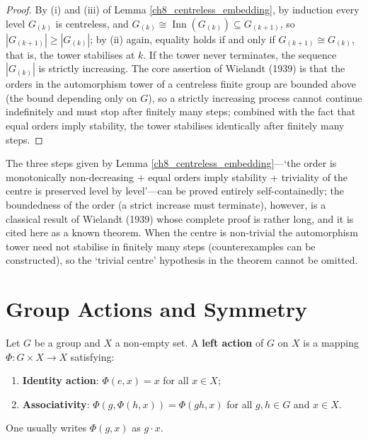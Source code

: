 \begin{proof}
By (i) and (iii) of Lemma \ref{ch8_centreless_embedding}, by induction every level $G_{(k)}$ is centreless, and $G_{(k)}\cong\operatorname{Inn}(G_{(k)})\subseteq G_{(k+1)}$, so $|G_{(k+1)}|\ge|G_{(k)}|$; by (ii) again, equality holds if and only if $G_{(k+1)}\cong G_{(k)}$, that is, the tower stabilises at $k$. If the tower never terminates, the sequence $|G_{(k)}|$ is strictly increasing. The core assertion of Wielandt (1939) is that the orders in the automorphism tower of a centreless finite group are bounded above (the bound depending only on $G$), so a strictly increasing process cannot continue indefinitely and must stop after finitely many steps; combined with the fact that equal orders imply stability, the tower stabilises identically after finitely many steps.
\end{proof}

\begin{remark}\label{rem:wielandt_boundary}
The three steps given by Lemma \ref{ch8_centreless_embedding}---`the order is monotonically non-decreasing + equal orders imply stability + triviality of the centre is preserved level by level'---can be proved entirely self-containedly; the boundedness of the order (a strict increase must terminate), however, is a classical result of Wielandt (1939) whose complete proof is rather long, and it is cited here as a known theorem. When the centre is non-trivial the automorphism tower need not stabilise in finitely many steps (counterexamples can be constructed), so the `trivial centre' hypothesis in the theorem cannot be omitted.
\end{remark}

\section{\texorpdfstring{Group Actions and Symmetry}{Group Actions and Symmetry}}

\begin{definition}\label{def:group_action_gf}
Let $G$ be a group and $X$ a non-empty set. A \textbf{left action} of $G$ on $X$ is a mapping $\Phi: G \times X \to X$ satisfying:
\begin{enumerate}[label=(\roman*)]
    \item \textbf{Identity action}: $\Phi(e, x) = x$ for all $x \in X$;
    \item \textbf{Associativity}: $\Phi(g, \Phi(h, x)) = \Phi(gh, x)$ for all $g,h \in G$ and $x \in X$.
\end{enumerate}
One usually writes $\Phi(g, x)$ as $g \cdot x$.
\end{definition}


